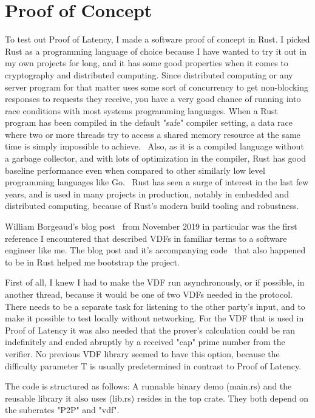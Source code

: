 \chapter{Proof of Concept}
\label{Proof of Concept}
To test out Proof of Latency, I made a software proof of concept in Rust. I picked Rust as a programming language of choice because I have wanted to try it out in my own projects for long, and it has some good properties when it comes to cryptography and distributed computing. Since distributed computing or any server program for that matter uses some sort of concurrency to get non-blocking responses to requests they receive, you have a very good chance of running into race conditions with most systems programming languages. When a Rust program has been compiled in the default "safe" compiler setting, a data race where two or more threads try to access a shared memory resource at the same time is simply impossible to achieve.~\cite{The_Rust_Project_Developers2018-xh} Also, as it is a compiled language without a garbage collector, and with lots of optimization in the compiler, Rust has good baseline performance even when compared to other similarly low level programming languages like Go.~\cite{Howarth2020-zc} Rust has seen a surge of interest in the last few years, and is used in many projects in production, notably in embedded and distributed computing, because of Rust's modern build tooling and robustness.

William Borgeaud's blog post~\cite{Borgeaud2019-wk} from November 2019 in particular was the first reference I encountered that described VDFs in familiar terms to a software engineer like me. The blog post and it's accompanying code~\cite{Borgeaud2019-wk} that also happened to be in Rust helped me bootstrap the project.

First of all, I knew I had to make the VDF run asynchronously, or if possible, in another thread, because it would be one of two VDFs needed in the protocol. There needs to be a separate task for listening to the other party's input, and to make it possible to test locally without networking. For the VDF that is used in Proof of Latency it was also needed that the prover's calculation could be ran indefinitely and ended abruptly by a received "cap" prime number from the verifier. No previous VDF library seemed to have this option, because the difficulty parameter T is usually predetermined in contrast to Proof of Latency.

The code is structured as follows: A runnable binary demo (main.rs) and the reusable library it also uses (lib.rs) resides in the top crate. They both depend on the subcrates "P2P" and "vdf".

